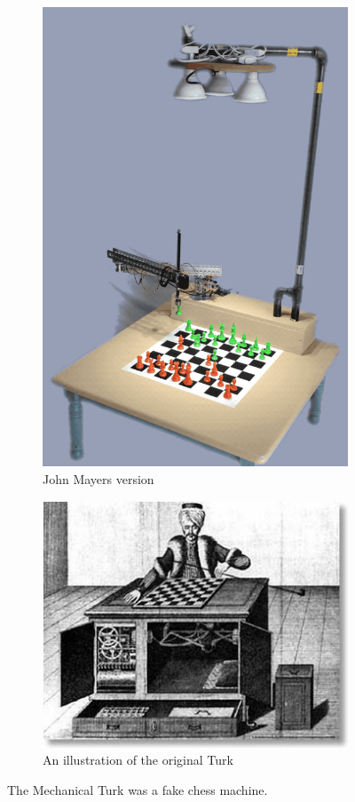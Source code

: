 \begin{figure}[H]

\begin{subfigure}{.48\textwidth}
  \centering
  \includegraphics[width=0.8\linewidth]{02_Literature_study/figures/Turkhero.png}
  \caption{John Mayers version}
  \label{fig:sub1}
\end{subfigure}
\begin{subfigure}{.48\textwidth}
  \includegraphics[width=1\linewidth]{02_Literature_study/figures/mechanical-turk.jpg}
  \caption{An illustration of the original Turk}
  \label{fig:sub2}
\end{subfigure}
\caption{The Mechanical Turk was a fake chess machine.}
\label{fig:test}
\end{figure}

